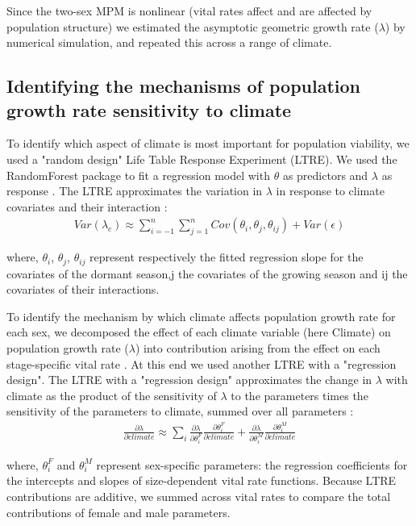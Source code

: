 \documentclass[12pt]{article}
\begin{document}
Since the two-sex MPM is nonlinear (vital rates affect and are affected by population structure) we estimated the asymptotic geometric growth rate ($\lambda$) by numerical simulation, and repeated this across a range of climate.

\subsection*{Identifying the mechanisms of population growth rate sensitivity to climate }
To identify which aspect of climate is most important for population viability, we used a "random design" Life Table Response Experiment (LTRE). 
We used the RandomForest package to fit a regression model with $\theta$ as predictors  and $\lambda$ as response \citep{ellner2016data,liaw2002classification}.
The LTRE approximates the variation in $\lambda$ in response to climate covariates and their interaction \citep{caswell2000matrix,hernandez2023exact}:
\begin{align}\label{eq:ltre}
Var(\lambda_{c})\approx \sum_{i=-1}^{n}\sum_{j=1}^{n} Cov(\theta_{i},\theta_{j},\theta_{ij}) + Var (\epsilon)
\end{align}

\noindent where, $\theta_{i}$, $\theta_{j}$, $\theta_{ij}$  represent respectively the fitted regression slope for the covariates of the dormant season,j the covariates of the growing season and ij the covariates of their interactions. 

To identify the mechanism by which climate affects population growth rate for each sex, we decomposed the effect of each climate variable (here Climate) on population growth rate ($\lambda$) into contribution arising from the effect on each stage-specific vital rate \citep{caswell2000matrix}.
At this end we used another LTRE with a "regression design". 
The LTRE with a "regression design" approximates the change in $\lambda$ with climate as the product of the sensitivity of $\lambda$ to the parameters times the sensitivity of the parameters to climate, summed over all parameters \citep{caswell1989analysis}:
\begin{align}\label{eq:ltresex}
\frac{\partial \lambda}{\partial climate} \approx \sum_{i} \frac{\partial \lambda}{\partial \theta^{F}_{i}} \frac{\partial \theta^{F}_{i}}{\partial climate} + \frac{\partial \lambda}{\partial \theta^{M}_{i}} \frac{\partial \theta^{M}_{i}}{\partial climate}
\end{align}

\noindent where, $\theta^{F}_{i}$ and $\theta^{M}_{i}$ represent sex-specific parameters: the regression coefficients for the intercepts and slopes of size-dependent vital rate functions. 
Because LTRE contributions are additive, we summed across vital rates to compare the total contributions of female and male parameters. 
\end{document}
